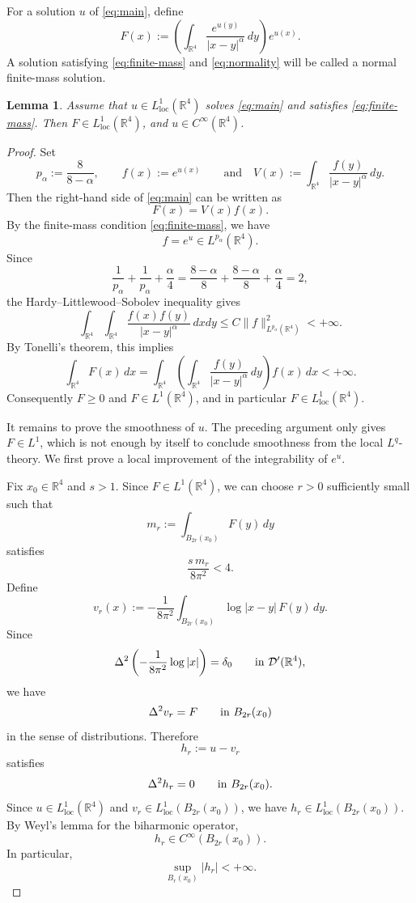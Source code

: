 \documentclass[11pt]{article}
\newtheorem{lemma}[theorem]{Lemma}
\numberwithin{equation}{section}
\begin{document}
For a solution \(u\) of \eqref{eq:main}, define
\[
F(x):=
\left(\int_{\mathbb R^{4}}\frac{e^{u(y)}}{|x-y|^{\alpha}}\,dy\right)e^{u(x)}.
\]
A solution satisfying \eqref{eq:finite-mass} and \eqref{eq:normality} will be called a normal finite-mass solution.


\begin{lemma}\label{lem:classification-regularity}
Assume that \(u\in L^{1}_{\operatorname{loc}}(\mathbb R^{4})\) solves \eqref{eq:main} and satisfies \eqref{eq:finite-mass}. Then \(F\in L^{1}_{\operatorname{loc}}(\mathbb R^{4})\), and \(u\in C^{\infty}(\mathbb R^{4})\).
\end{lemma}

\begin{proof}
Set
\[
p_{\alpha}:=\frac{8}{8-\alpha},\qquad
f(x):=e^{u(x)}
\qquad
\mbox{and}\quad
V(x):=\int_{\mathbb R^{4}}\frac{f(y)}{|x-y|^{\alpha}}\,dy .
\]
Then the right-hand side of \eqref{eq:main} can be written as
\[
F(x)=V(x)f(x).
\]
By the finite-mass condition \eqref{eq:finite-mass}, we have
\[
f=e^{u}\in L^{p_{\alpha}}(\mathbb R^{4}).
\]
Since
\[
\frac{1}{p_{\alpha}}+\frac{1}{p_{\alpha}}+\frac{\alpha}{4}
=
\frac{8-\alpha}{8}+\frac{8-\alpha}{8}+\frac{\alpha}{4}
=2,
\]
the Hardy--Littlewood--Sobolev inequality gives
\[
\int_{\mathbb R^{4}}\int_{\mathbb R^{4}}
\frac{f(x)f(y)}{|x-y|^{\alpha}}\,dxdy
\leq
C
\|f\|_{L^{p_{\alpha}}(\mathbb R^{4})}^{2}
<+\infty .
\]
By Tonelli's theorem, this implies
\[
\int_{\mathbb R^{4}}F(x)\,dx
=
\int_{\mathbb R^{4}}
\left(
\int_{\mathbb R^{4}}\frac{f(y)}{|x-y|^{\alpha}}\,dy
\right)f(x)\,dx
<+\infty .
\]
Consequently \(F\geq0\) and \(F\in L^{1}(\mathbb R^{4})\), and in
particular \(F\in L^{1}_{\operatorname{loc}}(\mathbb R^{4})\).

It remains to prove the smoothness of \(u\). The preceding argument only gives \(F\in L^{1}\), which is not enough by itself to conclude smoothness from the local \(L^{q}\)-theory. We first prove a local improvement of the integrability of \(e^{u}\).

Fix \(x_{0}\in\mathbb R^{4}\) and \(s>1\). Since \(F\in L^{1}(\mathbb R^{4})\), we can choose \(r>0\) sufficiently small such that
\[
m_{r}:=\int_{B_{2r}(x_{0})}F(y)\,dy
\]
satisfies
\[
\frac{s\,m_{r}}{8\pi^{2}}<4.
\]
Define
\[
v_{r}(x):=
-\frac{1}{8\pi^{2}}
\int_{B_{2r}(x_{0})}\log |x-y|\,F(y)\,dy .
\]
Since
\[
\Delta^{2}\left(-\frac{1}{8\pi^{2}}\log |x|\right)=\delta_{0}
\qquad \hbox{in } \mathcal D'(\mathbb R^{4}),
\]
we have
\[
\Delta^{2}v_{r}=F
\qquad \hbox{in } B_{2r}(x_{0})
\]
in the sense of distributions. Therefore
\[
h_{r}:=u-v_{r}
\]
satisfies
\[
\Delta^{2}h_{r}=0
\qquad \hbox{in } B_{2r}(x_{0}).
\]
Since \(u\in L^{1}_{\operatorname{loc}}(\mathbb R^{4})\) and \(v_{r}\in L^{1}_{\operatorname{loc}}(B_{2r}(x_{0}))\), we have \(h_{r}\in L^{1}_{\operatorname{loc}}(B_{2r}(x_{0}))\). By Weyl's lemma for the biharmonic operator,
\[
h_{r}\in C^{\infty}(B_{2r}(x_{0})).
\]
In particular,
\[
\sup_{B_{r}(x_{0})}|h_{r}|<+\infty .
\]


\end{proof}
\end{document}
